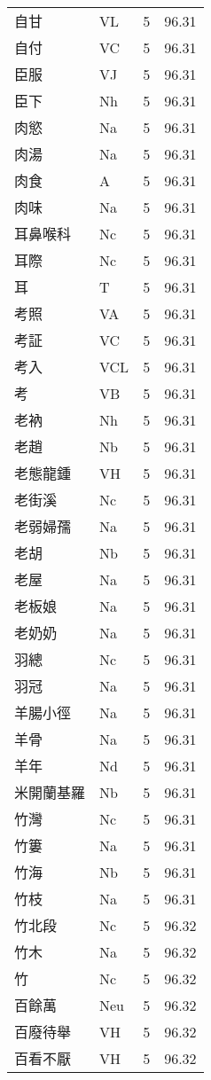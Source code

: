 \documentclass[twocolumn]{book}
\begin{document}
\begin{supertabular}{llrr}
自甘 & VL & 5 &  96.31\\
自付 & VC & 5 &  96.31\\
臣服 & VJ & 5 &  96.31\\
臣下 & Nh & 5 &  96.31\\
肉慾 & Na & 5 &  96.31\\
肉湯 & Na & 5 &  96.31\\
肉食 & A & 5 &  96.31\\
肉味 & Na & 5 &  96.31\\
耳鼻喉科 & Nc & 5 &  96.31\\
耳際 & Nc & 5 &  96.31\\
耳 & T & 5 &  96.31\\
考照 & VA & 5 &  96.31\\
考証 & VC & 5 &  96.31\\
考入 & VCL & 5 &  96.31\\
考 & VB & 5 &  96.31\\
老衲 & Nh & 5 &  96.31\\
老趙 & Nb & 5 &  96.31\\
老態龍鍾 & VH & 5 &  96.31\\
老街溪 & Nc & 5 &  96.31\\
老弱婦孺 & Na & 5 &  96.31\\
老胡 & Nb & 5 &  96.31\\
老屋 & Na & 5 &  96.31\\
老板娘 & Na & 5 &  96.31\\
老奶奶 & Na & 5 &  96.31\\
羽總 & Nc & 5 &  96.31\\
羽冠 & Na & 5 &  96.31\\
羊腸小徑 & Na & 5 &  96.31\\
羊骨 & Na & 5 &  96.31\\
羊年 & Nd & 5 &  96.31\\
米開蘭基羅 & Nb & 5 &  96.31\\
竹灣 & Nc & 5 &  96.31\\
竹簍 & Na & 5 &  96.31\\
竹海 & Nb & 5 &  96.31\\
竹枝 & Na & 5 &  96.31\\
竹北段 & Nc & 5 &  96.32\\
竹木 & Na & 5 &  96.32\\
竹 & Nc & 5 &  96.32\\
百餘萬 & Neu & 5 &  96.32\\
百廢待舉 & VH & 5 &  96.32\\
百看不厭 & VH & 5 &  96.32\\

\end{supertabular}
\end{document}
